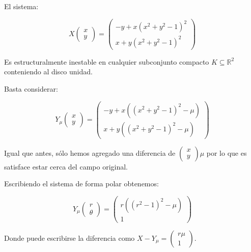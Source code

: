 \begin{exmp}
	
	El sistema:
	
	\begin{equation*}
		X\begin{pmatrix}
			x\\
			y
		\end{pmatrix} = \begin{pmatrix}
			-y+x(x^2+y^2-1)^2\\
			x+y(x^2+y^2-1)^2
		\end{pmatrix}
	\end{equation*}
	
	Es estructuralmente inestable en cualquier subconjunto compacto $K\subseteq \mathbb{R}^2$ conteniendo al disco unidad.
	
	Basta considerar:
	
	\begin{equation*}
		Y_\mu\begin{pmatrix}
			x\\
			y
		\end{pmatrix} = \begin{pmatrix}
			-y+x((x^2+y^2-1)^2-\mu)\\
			x+y((x^2+y^2-1)^2-\mu)
		\end{pmatrix}
	\end{equation*}
	
	Igual que antes, sólo hemos agregado una diferencia de $\begin{pmatrix}
		x\\
		y
	\end{pmatrix}\mu$ por lo que es satisface estar cerca del campo original.
	
	
	
	Escribiendo el sistema de forma polar obtenemos:
	
	\begin{equation*}
		Y_\mu\begin{pmatrix}
			r\\
			\theta
		\end{pmatrix} = \begin{pmatrix}
			r((r^2-1)^2-\mu)\\
			1
		\end{pmatrix}
	\end{equation*}
	
	Donde puede escribirse la diferencia como $X - Y_\mu = \begin{pmatrix}
		r\mu  \\
		1
	\end{pmatrix}$.
	

\end{exmp}
